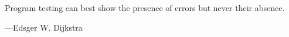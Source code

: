 \documentclass[]{article}
\newcommand{
	\myquote
}[2]{
	\begin{center}
		#1
		\par
		---#2
	\end{center}
}
\begin{document}
	\myquote{Program testing can best show the presence of errors but never their absence.}{Edsger W. Dijkstra}
\end{document}
